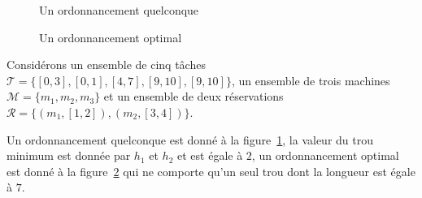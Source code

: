 \documentclass[a4paper,9pt]{book}
\begin{document}
\begin{figure}
    \begin{center}
        \begin{ordo}[10]{3}{1}{10}


        \end{ordo}
    \end{center}
    \caption{Un ordonnancement quelconque}
    \label{ex1ordquelc}
\end{figure}
            
\begin{figure}
    \begin{center}
        \begin{ordo}[10]{3}{1}{10}


        \end{ordo}
    \end{center}
    \caption{Un ordonnancement optimal}
    \label{ex1ordopt}
\end{figure}

\begin{ex}
    Considérons un ensemble de cinq tâches $\mathcal{T} = \{[0, 3], [0,1], [4,7],
    [9,10], [9,10]\}$, un ensemble de trois machines $\mathcal{M} = \{m_1, m_2, m_3\}$ et un
    ensemble de deux réservations $\mathcal{R} = \{(m_1, [1,2]), (m_2, [3,4])\}$.

    Un ordonnancement quelconque est donné à la figure~\ref{ex1ordquelc}, la valeur du trou minimum
    est donnée par $h_1$ et $h_2$ et est égale à $2$, un ordonnancement optimal est donné à la
    figure~\ref{ex1ordopt} qui ne comporte qu'un seul trou dont la longueur est égale à $7$.
\end{ex}
\end{document}
